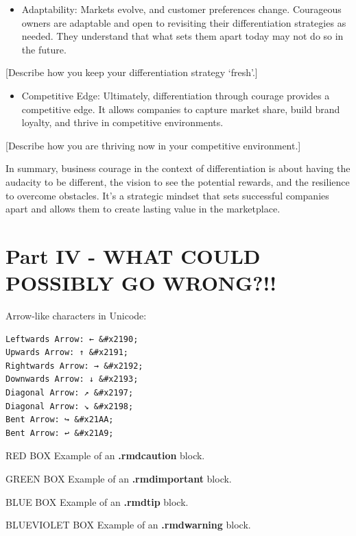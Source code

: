 \documentclass[
]{book}
\providecommand{\tightlist}{%
  \setlength{\itemsep}{0pt}\setlength{\parskip}{0pt}}
\begin{document}
\begin{itemize}
\tightlist
\item
  Adaptability: Markets evolve, and customer preferences change. Courageous owners are adaptable and open to revisiting their differentiation strategies as needed. They understand that what sets them apart today may not do so in the future.
\end{itemize}

{{[}Describe how you keep your differentiation strategy `fresh'.{]}}

\begin{itemize}
\tightlist
\item
  Competitive Edge: Ultimately, differentiation through courage provides a competitive edge. It allows companies to capture market share, build brand loyalty, and thrive in competitive environments.
\end{itemize}

{{[}Describe how you are thriving now in your competitive environment.{]}}

In summary, business courage in the context of differentiation is about having the audacity to be different, the vision to see the potential rewards, and the resilience to overcome obstacles. It's a strategic mindset that sets successful companies apart and allows them to create lasting value in the marketplace.

\hypertarget{part-part-iv---what-could-possibly-go-wrong}{%
\part*{Part IV - WHAT COULD POSSIBLY GO WRONG?!!}\label{part-part-iv---what-could-possibly-go-wrong}}


Arrow-like characters in Unicode:

\begin{verbatim}
Leftwards Arrow: ← &#x2190;
Upwards Arrow: ↑ &#x2191;
Rightwards Arrow: → &#x2192;
Downwards Arrow: ↓ &#x2193;
Diagonal Arrow: ↗ &#x2197;
Diagonal Arrow: ↘ &#x2198;
Bent Arrow: ↪ &#x21AA;
Bent Arrow: ↩ &#x21A9;
\end{verbatim}

RED BOX Example of an \textbf{.rmdcaution} block.

GREEN BOX Example of an \textbf{.rmdimportant} block.

BLUE BOX Example of an \textbf{.rmdtip} block.

BLUEVIOLET BOX Example of an \textbf{.rmdwarning} block.
\end{document}
